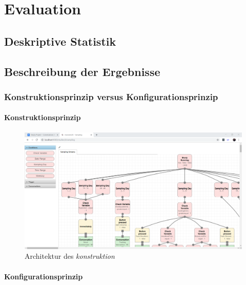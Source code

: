 
\chapter{Evaluation}
\label{ch:evaluation}

\section{Deskriptive Statistik}

\section{Beschreibung der Ergebnisse}

\subsection{Konstruktionsprinzip versus Konfigurationsprinzip}

\subsubsection{Konstruktionsprinzip}
\begin{figure}[h]
\centering
\includegraphics[width=1\textwidth]{pictures/konstruktion}
\caption{Architektur des \emph{konstruktion}}
\label{therapyBuilder}
\end{figure}

\subsubsection{Konfigurationsprinzip}

